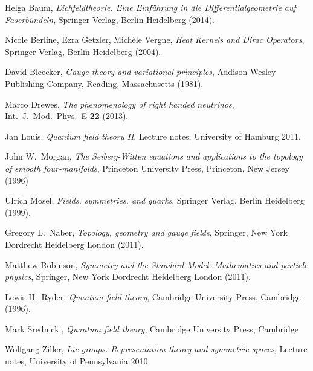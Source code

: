 \documentclass[11pt]{amsart}
\theoremstyle{definition}
\theoremstyle{remark}
\numberwithin{equation}{section}
\begin{document}
\begin{thebibliography}{999}

 Helga Baum, {\sl Eichfeldtheorie. Eine Einf\"uhrung in die Differentialgeometrie auf Faserb\"undeln}, Springer Verlag, Berlin Heidelberg (2014).

 Nicole Berline, Ezra Getzler, Mich\`ele Vergne, {\sl Heat Kernels and Dirac Operators}, Springer-Verlag, Berlin Heidelberg (2004).

 David Bleecker, {\sl Gauge theory and variational principles}, Addison-Wesley Publishing Company, Reading, Massachusetts (1981).

 Marco Drewes, {\em The phenomenology of right handed neutrinos}, Int.~J.~Mod.~Phys.~E {\bf 22} (2013).

 Jan Louis, {\em Quantum field theory II}, Lecture notes, University of Hamburg 2011.

 John W.~Morgan, {\sl The Seiberg-Witten equations and applications to the topology of smooth four-manifolds}, Princeton University Press, Princeton, New Jersey (1996)

 Ulrich Mosel, {\sl Fields, symmetries, and quarks}, Springer Verlag, Berlin Heidelberg (1999).

 Gregory L.~Naber, {\sl Topology, geometry and gauge fields}, Springer, New York Dordrecht Heidelberg London (2011).

 Matthew Robinson, {\sl Symmetry and the Standard Model. Mathematics and particle physics}, Springer, New York Dordrecht Heidelberg London (2011).

Lewis H.~Ryder, {\sl Quantum field theory}, Cambridge University Press, Cambridge (1996).

 Mark Srednicki, {\sl Quantum field theory}, Cambridge University Press, Cambridge

 Wolfgang Ziller, {\em Lie groups. Representation theory and symmetric spaces}, Lecture notes, University of Pennsylvania 2010.



\end{thebibliography}
\bigskip
\bigskip
\end{document}
